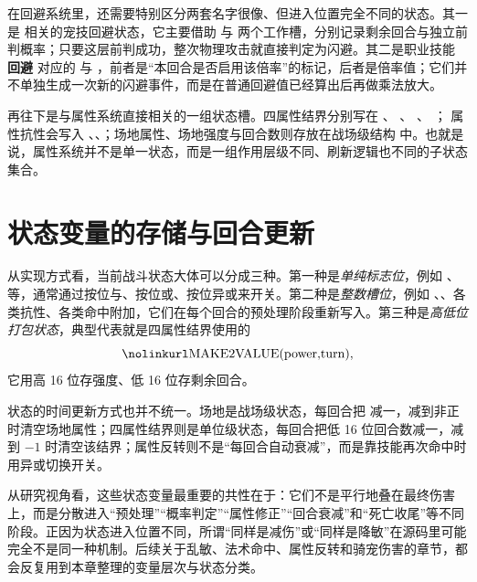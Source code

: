 在回避系统里，还需要特别区分两套名字很像、但进入位置完全不同的状态。其一是  相关的宠技回避状态，它主要借助  与  两个工作槽，分别记录剩余回合与独立前判概率；只要这层前判成功，整次物理攻击就直接判定为闪避。其二是职业技能 \textbf{回避} 对应的  与 ，前者是“本回合是否启用该倍率”的标记，后者是倍率值；它们并不单独生成一次新的闪避事件，而是在普通回避值已经算出后再做乘法放大。

再往下是与属性系统直接相关的一组状态槽。四属性结界分别写在
、
、
、
；
属性抗性会写入 、、；场地属性、场地强度与回合数则存放在战场级结构  中。也就是说，属性系统并不是单一状态，而是一组作用层级不同、刷新逻辑也不同的子状态集合。

\section{状态变量的存储与回合更新}

从实现方式看，当前战斗状态大体可以分成三种。第一种是\emph{单纯标志位}，例如 、 等，通常通过按位与、按位或、按位异或来开关。第二种是\emph{整数槽位}，例如 、、各类抗性、各类命中附加，它们在每个回合的预处理阶段重新写入。第三种是\emph{高低位打包状态}，典型代表就是四属性结界使用的
\begin{equation}
    \code{MAKE2VALUE(power,turn)},
\end{equation}
它用高 16 位存强度、低 16 位存剩余回合。

状态的时间更新方式也并不统一。场地是战场级状态，每回合把  减一，减到非正时清空场地属性；四属性结界则是单位级状态，每回合把低 16 位回合数减一，减到 $-1$ 时清空该结界；属性反转则不是“每回合自动衰减”，而是靠技能再次命中时用异或切换开关。

从研究视角看，这些状态变量最重要的共性在于：它们不是平行地叠在最终伤害上，而是分散进入“预处理”“概率判定”“属性修正”“回合衰减”和“死亡收尾”等不同阶段。正因为状态进入位置不同，所谓“同样是减伤”或“同样是降敏”在源码里可能完全不是同一种机制。后续关于乱敏、法术命中、属性反转和骑宠伤害的章节，都会反复用到本章整理的变量层次与状态分类。


